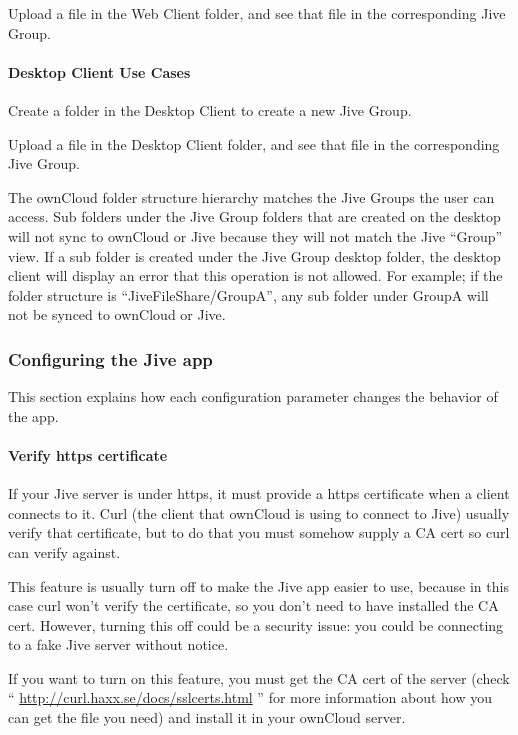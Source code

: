 \documentclass[letterpaper,10pt,english]{sphinxmanual}
\begin{document}
Upload a file in the Web Client folder, and see that file in the corresponding Jive Group.


\paragraph{Desktop Client Use Cases}
\label{enterprise_external_storage/jive_configuration:desktop-client-use-cases}
Create a folder in the Desktop Client to create a new Jive Group.

Upload a file in the Desktop Client folder, and see that file in the corresponding Jive Group.

The ownCloud folder structure hierarchy matches the Jive Groups the user can access. Sub folders under the Jive Group
folders that are created on the desktop will not sync to ownCloud or Jive because they will not match the Jive “Group”
view. If a sub folder is created under the Jive Group desktop folder, the desktop client will display an error that
this operation is not allowed. For example; if the folder structure is “JiveFileShare/GroupA”, any sub folder under
GroupA will not be synced to ownCloud or Jive.


\subsubsection{Configuring the Jive app}
\label{enterprise_external_storage/jive_configuration:configuring-the-jive-app}
This section explains how each configuration parameter changes the behavior of the app.


\paragraph{Verify https certificate}
\label{enterprise_external_storage/jive_configuration:verify-https-certificate}
If your Jive server is under https, it must provide a https certificate when a client connects to it. Curl (the client
that ownCloud is using to connect to Jive) usually verify that certificate, but to do that you must somehow supply
a CA cert so curl can verify against.

This feature is usually turn off to make the Jive app easier to use, because in this case curl won't verify the
certificate, so you don't need to have installed the CA cert. However, turning this off could be a security issue:
you could be connecting to a fake Jive server without notice.

If you want to turn on this feature, you must get the CA cert of the server (check “
\href{http://curl.haxx.se/docs/sslcerts.html}{http://curl.haxx.se/docs/sslcerts.html}
” for more information about how you can get the file you need)
and install it in your ownCloud server.
\end{document}
